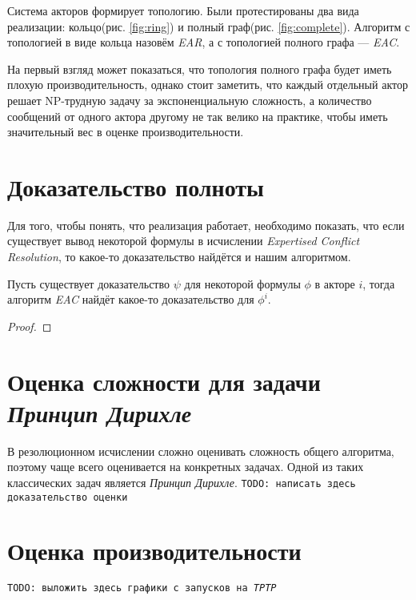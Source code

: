 Система акторов формирует топологию. Были протестированы два вида реализации: кольцо(рис. \ref{fig:ring}) и полный граф(рис. \ref{fig:complete}). Алгоритм с топологией в виде кольца назовём \emph{EAR}, а с топологией полного графа --- \emph{EAC}. 

На первый взгляд может показаться, что топология полного графа будет иметь плохую производительность, однако стоит заметить, что каждый отдельный актор решает NP-трудную задачу за экспоненциальную сложность, а количество сообщений от одного актора другому не так велико на практике, чтобы иметь значительный вес в оценке производительности.

\section{Доказательство полноты}
Для того, чтобы понять, что реализация работает, необходимо показать, что если существует вывод некоторой формулы в исчислении \emph{Expertised Conflict Resolution}, то какое-то доказательство найдётся и нашим алгоритмом. 

\begin{theorem}
Пусть существует доказательство $\psi$ для некоторой формулы $\phi$ в акторе $i$, тогда алгоритм \emph{EAC} найдёт какое-то доказательство для $\phi^i$.
\end{theorem}
\begin{proof}

\end{proof}

\section{Оценка сложности для задачи \emph{Принцип Дирихле}}
В резолюционном исчислении сложно оценивать сложность общего алгоритма, поэтому чаще всего оценивается на конкретных задачах. Одной из таких классических задач является \emph{Принцип Дирихле}. 
\texttt{TODO: написать здесь доказательство оценки}
\section{Оценка производительности}
\texttt{TODO: выложить здесь графики с запусков на \emph{TPTP}}

